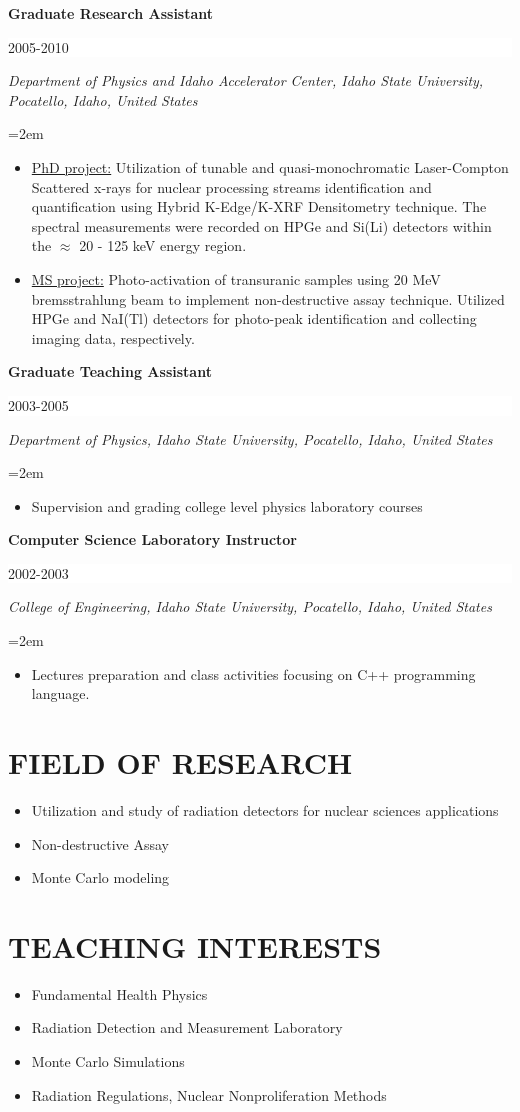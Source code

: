 \documentclass[paper=letter,fontsize=11pt]{scrartcl} %
\newcommand{\sepspace}{\vspace*{1em}}		%
\newcommand{\NewPart}[2]{\section*{\uppercase{#1} #2}}
\newcommand{\EducationEntry}[4]{
		\noindent \textbf{#1} \hfill      %
		\colorbox{White}{%
			\parbox{6em}{%
			\hfill\color{Black}#2}} \par  %
		\noindent \textit{#3} \par        %
		\noindent\hangindent=2em\hangafter=0 \small #4 %
		\normalsize \par}
\begin{document}
\EducationEntry{Graduate Research Assistant}{2005-2010}{Department of Physics and Idaho Accelerator Center, Idaho State University, Pocatello, Idaho, United States}{\begin{itemize}
\item \underline{PhD project:} Utilization of tunable and quasi-monochromatic Laser-Compton Scattered x-rays for nuclear processing streams identification and quantification using Hybrid K-Edge/K-XRF Densitometry technique. The spectral measurements were recorded on HPGe and Si(Li) detectors within the \(\approx\) 20 - 125 keV energy region.
\item \underline{MS project:} Photo-activation of transuranic samples using 20 MeV bremsstrahlung beam to implement non-destructive assay technique. Utilized HPGe and NaI(Tl) detectors for photo-peak identification and collecting imaging data, respectively.
\end{itemize}}
\sepspace

\EducationEntry{Graduate Teaching Assistant}{2003-2005}{Department of Physics, Idaho State University, Pocatello, Idaho, United States}{\begin{itemize}
\item{Supervision and  grading college level physics laboratory courses}\end{itemize}}
\sepspace

\EducationEntry{Computer Science Laboratory Instructor}{2002-2003}{College of Engineering, Idaho State University, Pocatello, Idaho, United States}{\begin{itemize}
\item{Lectures preparation and class activities focusing on C++ programming language.}\end{itemize}}

\NewPart{Field of Research}{}
\begin{itemize}
\item Utilization and study of radiation detectors for nuclear sciences applications 
\item Non-destructive Assay
\item Monte Carlo modeling
\end{itemize}

\NewPart{Teaching INTERESTS}{}
\begin{itemize}
\item Fundamental Health Physics
\item Radiation Detection and Measurement Laboratory 
\item Monte Carlo Simulations
\item Radiation Regulations, Nuclear Nonproliferation Methods
\end{itemize}
\end{document}
